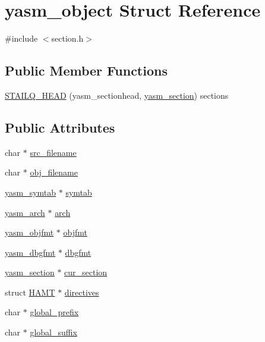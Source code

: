 \hypertarget{structyasm__object}{\section{yasm\-\_\-object Struct Reference}
\label{structyasm__object}
}


{\ttfamily \#include $<$section.\-h$>$}

\subsection*{Public Member Functions}
\begin{DoxyCompactItemize}
\item 
\hyperlink{structyasm__object_a08ebfa16899c6390ac5784dc6d509571}{S\-T\-A\-I\-L\-Q\-\_\-\-H\-E\-A\-D} (yasm\-\_\-sectionhead, \hyperlink{structyasm__section}{yasm\-\_\-section}) sections
\end{DoxyCompactItemize}
\subsection*{Public Attributes}
\begin{DoxyCompactItemize}
\item 
char $\ast$ \hyperlink{structyasm__object_a3cca921a2a787f690d492e697d1d3fc3}{src\-\_\-filename}
\item 
char $\ast$ \hyperlink{structyasm__object_a8d27925b70b10101fc1894aa96c36436}{obj\-\_\-filename}
\item 
\hyperlink{structyasm__symtab}{yasm\-\_\-symtab} $\ast$ \hyperlink{structyasm__object_aeb4c1c12d801961f2700314d9d355939}{symtab}
\item 
\hyperlink{coretype_8h_a8e0de61d73c940f0e7b6ef12e0dc1c70}{yasm\-\_\-arch} $\ast$ \hyperlink{structyasm__object_a3613b1529c376dff8dfb24f97e3456e9}{arch}
\item 
\hyperlink{coretype_8h_a391681636b57724e337bf97f9832adb7}{yasm\-\_\-objfmt} $\ast$ \hyperlink{structyasm__object_a968aebd8b95316a9d759561f55eb00ed}{objfmt}
\item 
\hyperlink{coretype_8h_ac8215052ae972b3462380abe1fa5291a}{yasm\-\_\-dbgfmt} $\ast$ \hyperlink{structyasm__object_a7da056c1035bff2c27ba4619d0373153}{dbgfmt}
\item 
\hyperlink{structyasm__section}{yasm\-\_\-section} $\ast$ \hyperlink{structyasm__object_a355bebcbf4c02847afac47903c9c9e3a}{cur\-\_\-section}
\item 
struct \hyperlink{struct_h_a_m_t}{H\-A\-M\-T} $\ast$ \hyperlink{structyasm__object_afad452bed93725ffad7e65227822bb4b}{directives}
\item 
char $\ast$ \hyperlink{structyasm__object_af563dc940847d21c144ca7af8fdbd3fe}{global\-\_\-prefix}
\item 
char $\ast$ \hyperlink{structyasm__object_a7ffd29de6e1d1cf360b76410afbea5dc}{global\-\_\-suffix}
\end{DoxyCompactItemize}


